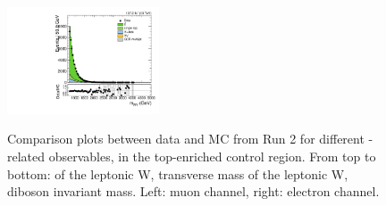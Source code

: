 \begin{figure}[htbp]
  \includegraphics[width=0.4\textwidth]{fig/analysis/CR_b1_e_allP_allC_allE_Run2_mWV.pdf}\\
  \caption{
    Comparison plots between data and MC from Run 2 for different \Wlep-related observables, in the top-enriched control region.
    From top to bottom: \pt of the leptonic W, transverse mass of the leptonic W, diboson invariant mass.
    Left: muon channel, right: electron channel.
    }
  \label{fig:CR_controlPlotsRun2_2}
\end{figure}

